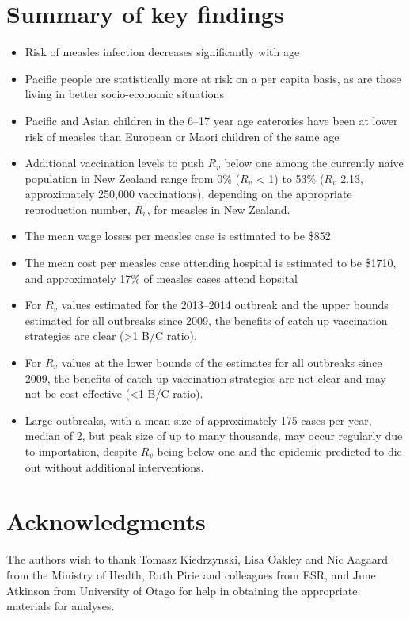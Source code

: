 \documentclass{article}
\begin{document}
\section {Summary of key findings}
\begin{itemize}
\item Risk of measles infection decreases significantly with age
\item Pacific people are statistically more at risk on a per capita basis, as are those living in better socio-economic situations
\item Pacific and Asian children in the 6--17 year age caterories have been at lower risk of measles than European or Maori children of the same age
\item Additional vaccination levels to push $R_v$ below one among the currently naive population in New Zealand range from 0\% ($R_v$ < 1) to 53\% ($R_v$ 2.13, approximately 250,000 vaccinations), depending on the appropriate reproduction number, $R_v$, for measles in New Zealand.
\item The mean wage losses per measles case is estimated to be \$852
\item The mean cost per measles case attending hospital is estimated to be \$1710, and approximately 17\% of measles cases attend hopsital
\item For $R_v$ values estimated for the 2013--2014 outbreak and the upper bounds estimated for all outbreaks since 2009, the benefits of catch up vaccination strategies are clear (>1 B/C ratio).
\item For $R_v$ values at the lower bounds of the estimates for all outbreaks since 2009, the benefits of catch up vaccination strategies are not clear and may not be cost effective (<1 B/C ratio).
\item Large outbreaks, with a mean size of approximately 175 cases per year, median of 2, but peak size of up to many thousands, may occur regularly due to importation, despite $R_v$ being below one and the epidemic predicted to die out without additional interventions.
\end{itemize}

\section{Acknowledgments}
The authors wish to thank Tomasz Kiedrzynski, Lisa Oakley and Nic Aagaard from the Ministry of Health, Ruth Pirie and colleagues from ESR, and June Atkinson from University of Otago for help in obtaining the appropriate materials for analyses.
\end{document}

